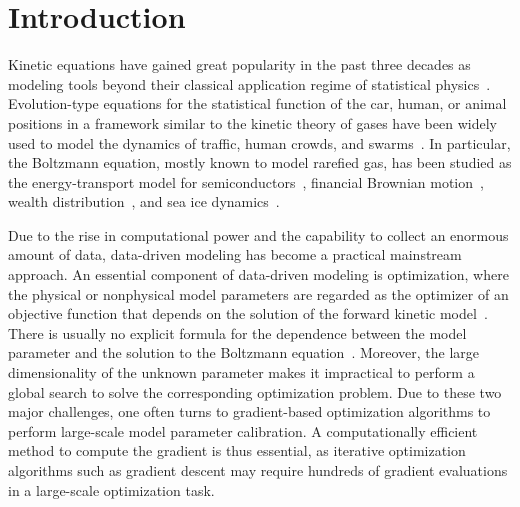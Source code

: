 \documentclass[12pt,nopreprintline]{elsarticle}
\begin{document}



\section{Introduction} \label{sec:Intro}
Kinetic equations have gained great popularity in the past three decades as modeling tools beyond their classical application regime of statistical physics~\cite{cordier2005kinetic,pareschi2013interacting,burini2016collective}. Evolution-type equations for the statistical function of the car, human, or animal positions in a framework similar to the kinetic theory of gases have been widely used to model the dynamics of traffic, human crowds, and swarms~\cite{albi2019vehicular}. In particular, the Boltzmann equation, mostly known to model rarefied gas, has been studied as the energy-transport model for semiconductors~\cite{poupaud1991diffusion,ben1996energy}, financial Brownian motion~\cite{kanazawa2018derivation}, wealth distribution~\cite{pareschi2014wealth}, and sea ice dynamics~\cite{davis2020super}.

Due to the rise in computational power and the capability to collect an enormous amount of data, data-driven modeling has become a practical mainstream approach. An essential component of data-driven modeling is optimization, where the physical or nonphysical model parameters are regarded as the optimizer of an objective function that depends on the solution of the forward kinetic model~\cite{albi2015kinetic}. There is usually no explicit formula for the dependence between the model parameter and the solution to the Boltzmann equation~\cite{albi2014boltzmann}. Moreover, the large dimensionality of the unknown parameter makes it impractical to perform a global search to solve the corresponding optimization problem. Due to these two major challenges, one often turns to gradient-based optimization algorithms to perform large-scale model parameter calibration. A computationally efficient method to compute the gradient is thus essential, as iterative optimization algorithms such as gradient descent may require hundreds of gradient evaluations in a large-scale optimization task.
\end{document}
